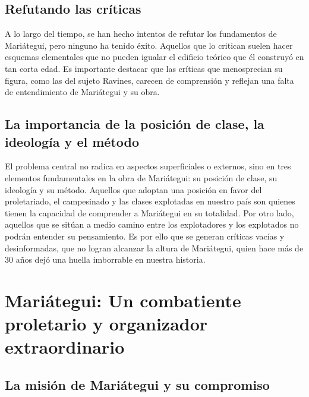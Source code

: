 \documentclass[
  a4paper,
]{article}
\begin{document}
\hypertarget{refutando-las-cruxedticas}{%
\subsection{Refutando las críticas}\label{refutando-las-cruxedticas}}

A lo largo del tiempo, se han hecho intentos de refutar los fundamentos
de Mariátegui, pero ninguno ha tenido éxito. Aquellos que lo critican
suelen hacer esquemas elementales que no pueden igualar el edificio
teórico que él construyó en tan corta edad. Es importante destacar que
las críticas que menosprecian su figura, como las del sujeto Ravines,
carecen de comprensión y reflejan una falta de entendimiento de
Mariátegui y su obra.

\hypertarget{la-importancia-de-la-posiciuxf3n-de-clase-la-ideologuxeda-y-el-muxe9todo}{%
\subsection{La importancia de la posición de clase, la ideología y el
método}\label{la-importancia-de-la-posiciuxf3n-de-clase-la-ideologuxeda-y-el-muxe9todo}}

El problema central no radica en aspectos superficiales o externos, sino
en tres elementos fundamentales en la obra de Mariátegui: su posición de
clase, su ideología y su método. Aquellos que adoptan una posición en
favor del proletariado, el campesinado y las clases explotadas en
nuestro país son quienes tienen la capacidad de comprender a Mariátegui
en su totalidad. Por otro lado, aquellos que se sitúan a medio camino
entre los explotadores y los explotados no podrán entender su
pensamiento. Es por ello que se generan críticas vacías y desinformadas,
que no logran alcanzar la altura de Mariátegui, quien hace más de 30
años dejó una huella imborrable en nuestra historia.

\hypertarget{mariuxe1tegui-un-combatiente-proletario-y-organizador-extraordinario}{%
\section{Mariátegui: Un combatiente proletario y organizador
extraordinario}\label{mariuxe1tegui-un-combatiente-proletario-y-organizador-extraordinario}}

\hypertarget{la-misiuxf3n-de-mariuxe1tegui-y-su-compromiso}{%
\subsection{La misión de Mariátegui y su
compromiso}\label{la-misiuxf3n-de-mariuxe1tegui-y-su-compromiso}}
\end{document}
